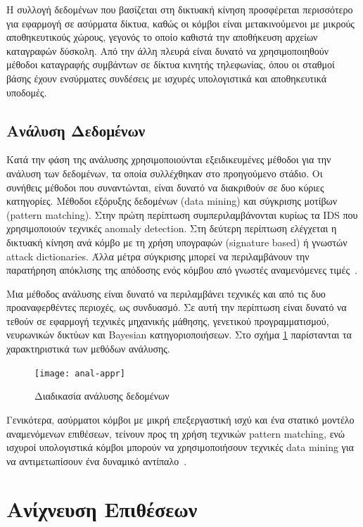 \documentclass[12pt]{report}
\begin{document}
Η συλλογή δεδομένων που βασίζεται στη δικτυακή κίνηση προσφέρεται περισσότερο για εφαρμογή σε ασύρματα δίκτυα, καθώς οι κόμβοι είναι μετακινούμενοι με μικρούς αποθηκευτικούς χώρους, γεγονός το οποίο καθιστά την αποθήκευση αρχείων καταγραφών δύσκολη. Από την άλλη πλευρά είναι δυνατό να χρησιμοποιηθούν μέθοδοι καταγραφής συμβάντων σε δίκτυα κινητής τηλεφωνίας, όπου οι σταθμοί βάσης έχουν ενσύρματες συνδέσεις με ισχυρές υπολογιστικά και αποθηκευτικά υποδομές.

\subsection{Ανάλυση Δεδομένων}
Κατά την φάση της ανάλυσης χρησιμοποιούνται εξειδικευμένες μέθοδοι για την ανάλυση των δεδομένων, τα οποία συλλέχθηκαν στο προηγούμενο στάδιο. Οι συνήθεις μέθοδοι που συναντώνται, είναι δυνατό να διακριθούν σε δυο κύριες κατηγορίες. Μέθοδοι εξόρυξης δεδομένων (\textlatin{data mining}) και σύγκρισης μοτίβων (\textlatin{pattern matching}). Στην πρώτη περίπτωση συμπεριλαμβάνονται κυρίως τα \textlatin{IDS} που χρησιμοποιούν τεχνικές \textlatin{anomaly detection}. Στη δεύτερη περίπτωση ελέγχεται η δικτυακή κίνηση ανά κόμβο με τη χρήση υπογραφών (\textlatin{signature based}) ή γνωστών \textlatin{attack dictionaries}. Άλλα μέτρα σύγκρισης μπορεί να περιλαμβάνουν την παρατήρηση απόκλισης της απόδοσης ενός κόμβου από γνωστές αναμενόμενες τιμές~\cite{paper:12}.

Μια μέθοδος ανάλυσης είναι δυνατό να περιλαμβάνει τεχνικές και από τις δυο προαναφερθέντες περιοχές, ως συνδυασμό. Σε αυτή την περίπτωση είναι δυνατό να τεθούν σε εφαρμογή τεχνικές μηχανικής μάθησης, γενετικού προγραμματισμού, νευρωνικών δικτύων και \textlatin{Bayesian} κατηγοριοποιήσεων. Στο σχήμα \ref{fig:anal-appr} παρίστανται τα χαρακτηριστικά των μεθόδων ανάλυσης.
\begin{figure}[ht]
\centering
\texttt{[image: anal-appr]}
\caption{Διαδικασία ανάλυσης δεδομένων}
\label{fig:anal-appr}
\end{figure}

Γενικότερα, ασύρματοι κόμβοι με μικρή επεξεργαστική ισχύ και ένα στατικό μοντέλο αναμενόμενων επιθέσεων, τείνουν προς τη χρήση τεχνικών \textlatin{pattern matching}, ενώ ισχυροί υπολογιστικά κόμβοι μπορούν να χρησιμοποιήσουν τεχνικές \textlatin{data mining} για να αντιμετωπίσουν ένα δυναμικό αντίπαλο~\cite{paper:12}.

\section{Ανίχνευση Επιθέσεων}
\end{document}
